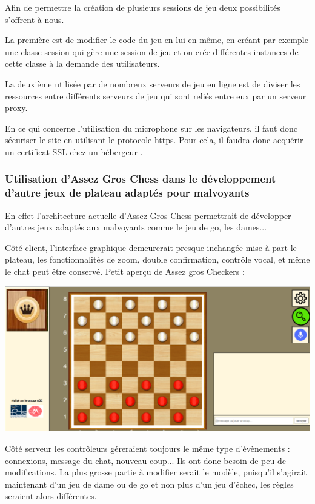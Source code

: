 \documentclass[12pt, openany]{report}
\begin{document}
Afin de permettre la création de plusieurs sessions de jeu deux possibilités s'offrent à nous.

La première est de modifier le code du jeu en lui en même, en créant par exemple une classe session qui gère une session de jeu et on crée différentes instances de cette classe à la demande des utilisateurs.

La deuxième utilisée par de nombreux serveurs de jeu en ligne est de diviser les ressources entre différents serveurs de jeu qui sont reliés entre eux par un serveur proxy.

En ce qui concerne l'utilisation du microphone sur les navigateurs, il faut donc sécuriser le site en utilisant le protocole https. Pour cela, il faudra donc acquérir un certificat SSL chez un hébergeur .

\subsubsection{Utilisation d'Assez Gros Chess dans le développement d'autre jeux de plateau adaptés pour malvoyants}

En effet l'architecture actuelle d'Assez Gros Chess permettrait de développer d'autres jeux adaptés aux malvoyants comme le jeu de go, les dames...

Côté client, l'interface graphique demeurerait presque inchangée mise à part le plateau, les fonctionnalités de zoom, double confirmation, contrôle vocal, et même le chat peut être conservé.
Petit aperçu de Assez gros Checkers :

\begin{center}
\centering
\includegraphics[width=14cm]{src/image10.png}    
\end{center}

Côté serveur les contrôleurs géreraient toujours le même type d'évènements : connexions, message du chat, nouveau coup...
Ils ont donc besoin de peu de modifications.
La plus grosse partie à modifier serait le modèle, puisqu'il s'agirait maintenant d'un jeu de dame ou de go et non plus d'un jeu d'échec, les règles seraient alors différentes.
\end{document}
